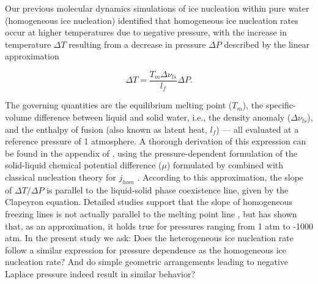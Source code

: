 \documentclass[journal abbreviation, manuscript]{copernicus}
\begin{document}

Our previous molecular dynamics simulations of ice nucleation within pure water (homogeneous ice nucleation) identified that homogeneous ice nucleation rates occur at higher temperatures due to negative pressure, with the increase in temperature $\Delta T$ resulting from a decrease in pressure $\Delta P$ described by the linear approximation \citep{rosky2022}

\begin{equation} \label{eq:dTdP}
    \Delta T = \frac{T_m \Delta \nu_{ls}}{l_f} \Delta P.
\end{equation}

\noindent The governing quantities are the equilibrium melting point ($T_m$), the specific-volume difference between liquid and solid water, i.e., the density anomaly ($\Delta \nu_{ls}$), and the enthalpy of fusion (also known as latent heat, $l_f$) --- all evaluated at a reference pressure of 1 atmosphere. A thorough derivation of this expression can be found in the appendix of \citet{rosky2022}, using the pressure-dependent formulation of the solid-liquid chemical potential difference ($\mu$) formulated by \citet{nemec2013} combined with classical nucleation theory for $j_{hom}$ \citep[see also][]{yang2018}. According to this approximation, the slope of $\Delta T/\Delta P$ is parallel to the liquid-solid phase coexistence line, given by the Clapeyron equation. Detailed studies support that the slope of homogeneous freezing lines is not actually parallel to the melting point line \citep{bianco2021, espinosa2016}, but \citet{rosky2022} has shown that, as an approximation, it holds true for pressures ranging from 1 atm to -1000 atm. In the present study we ask: Does the heterogeneous ice nucleation rate follow a similar expression for pressure dependence as the homogeneous ice nucleation rate? And do simple geometric arrangements leading to negative Laplace pressure indeed result in similar behavior?
\end{document}
